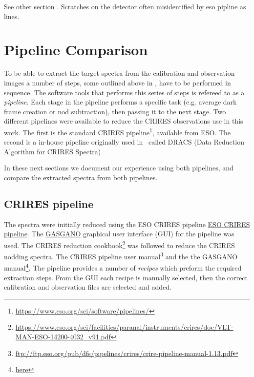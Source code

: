 See other section .
Scratches on the detector often misidentified by eso pipline as \thar lines.




\section{Pipeline Comparison}
To be able to extract the target spectra from the calibration and observation images a number of steps, some outlined above in , have to be performed in sequence. The software tools that performs this series of steps is refereed to as a \emph{pipeline}. Each stage in the pipeline performs a specific task (e.g. average dark frame creation or nod subtraction), then passing it to the next stage. Two different pipelines were available to reduce the CRIRES observations use in this work. The first is the standard CRIRES pipeline\footnote{\href{https://www.eso.org/sci/software/pipelines/}{https://www.eso.org/sci/software/pipelines/}}, available from ESO.
The second is a in-house pipeline originally  used in~\citet{figueira_radial_2010} called DRACS (Data Reduction Algorithm for CRIRES Spectra) 

In these next sections we document our experience using both pipelines, and compare the extracted spectra from both pipelines.


\subsection{CRIRES pipeline}
The spectra were initially reduced using the ESO CRIRES pipeline \href{ESO CRIRES pipeline}{ESO CRIRES pipeline}. The \href{https://www.eso.org/sci/software/gasgano.html}{GASGANO} graphical user interface (GUI) for the pipeline was used. The CRIRES reduction cookbook\footnote{\href{https://www.eso.org/sci/facilities/paranal/instruments/crires/doc/VLT-MAN-ESO-14200-4032\_v91.pdf}{https://www.eso.org/sci/facilities/paranal/instruments/crires/doc/VLT-MAN-ESO-14200-4032\_v91.pdf}} was followed to reduce the CRIRES nodding spectra. The CRIRES pipeline user manual\footnote{\href{ftp://ftp.eso.org/pub/dfs/pipelines/crires/crire-pipeline-manual-1.13.pdf}{ftp://ftp.eso.org/pub/dfs/pipelines/crires/crire-pipeline-manual-1.13.pdf}} and the the GASGANO manual\footnote{\href{here}{here}}. The pipeline provides a number of \emph{recipes} which preform the required extraction steps. From the GUI each recipe is manually selected, then the correct calibration and observation files are selected and added. 

